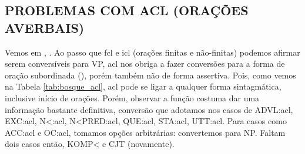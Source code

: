 \subsection{PROBLEMAS COM ACL (ORAÇÕES AVERBAIS)}
\label{subsec:tag_acl}
Vemos em , . Ao passo que fcl e icl (orações finitas e não-finitas) podemos afirmar serem conversíveis para VP, acl nos obriga a fazer conversões para a forma de oração subordinada (), porém também não de forma assertiva. Pois, como vemos na Tabela \ref{tab:bosque_acl}, acl pode se ligar a qualquer forma sintagmática, inclusive início de orações. Porém, observar a função costuma dar uma informação bastante definitiva, conversão que adotamos nos casos de ADVL:acl, EXC:acl, N<:acl, N<PRED:acl, QUE:acl, STA:acl, UTT:acl. Para casos como ACC:acl e OC:acl, tomamos opções arbitrárias: convertemos para NP. Faltam dois casos então, KOMP< e CJT (novamente).
\begin{center}
    
\end{center}
